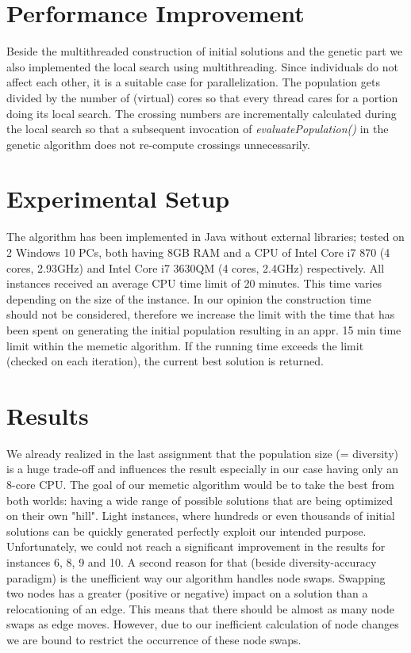 \documentclass[11pt]{article}
\begin{document}
\section{Performance Improvement}
\hspace{0.5cm}Beside the multithreaded construction of initial solutions and the genetic part we also implemented the local search using multithreading. Since individuals do not affect each other, it is a suitable case for parallelization. The population gets divided by the number of (virtual) cores so that every thread cares for a portion doing its local search. The crossing numbers are incrementally calculated during the local search so that a subsequent invocation of \textit{evaluatePopulation()} in the genetic algorithm does not re-compute crossings unnecessarily.


\section{Experimental Setup}
\hspace{0.5cm}The algorithm has been implemented in Java without external libraries; tested on 2 Windows 10 PCs, both having 8GB RAM and a CPU of Intel Core i7 870 (4 cores, 2.93GHz) and Intel Core i7 3630QM (4 cores, 2.4GHz) respectively. All instances received an average CPU time limit of 20 minutes. This time varies depending on the size of the instance. In our opinion the construction time should not be considered, therefore we increase the limit with the time that has been spent on generating the initial population resulting in an appr. 15 min time limit within the memetic algorithm.  If the running time exceeds the limit (checked on each iteration), the current best solution is returned. 

\section{Results}
\hspace{0.5cm}We already realized in the last assignment that the population size (= diversity) is a huge trade-off and influences the result especially in our case having only an 8-core CPU. The goal of our memetic algorithm would be to take the best from both worlds: having a wide range of possible solutions that are being optimized on their own "hill". Light instances, where hundreds or even thousands of initial solutions can be quickly generated perfectly exploit our intended purpose. Unfortunately, we could not reach a significant improvement in the results for instances 6, 8, 9 and 10. A second reason for that (beside diversity-accuracy paradigm) is the unefficient way our algorithm handles node swaps. Swapping two nodes has a greater (positive or negative) impact on a solution than a relocationing of an edge. This means that there should be almost as many node swaps as edge moves. However, due to our inefficient calculation of node changes we are bound to restrict the occurrence of these node swaps.\\
\end{document}
